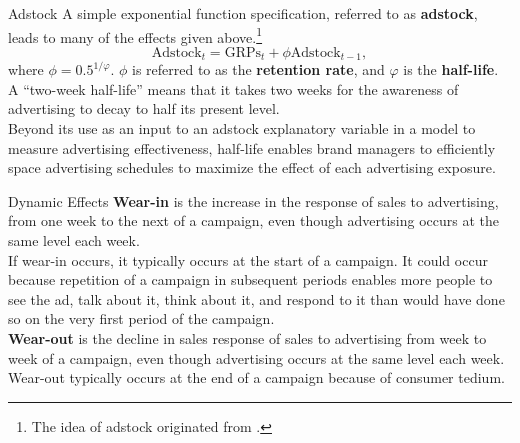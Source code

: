 \documentclass[pdf]{beamer}
\newcommand{\empr}[1]{{\color{franklinblue}\textbf{#1}}}
\theoremstyle{remark}
\theoremstyle{definition}
\begin{document}
\begin{frame}[t]{Adstock}
A simple exponential function specification, referred to as \empr{adstock}, leads to many of the effects given above.\footnote{The idea of adstock originated from \cite{broadbent1979}.} \\
\vspace{-0.5ex}
\begin{equation}
 \text{Adstock}_t = \text{GRPs}_t + \phi \text{Adstock}_{t-1},
\end{equation}
where $\phi = 0.5^{1/\varphi}$.  $\phi$ is referred to as the \empr{retention rate}, and $\varphi$ is the \empr{half-life}. \\
\vspace{1.5ex}
A ``two-week half-life'' means that it takes two weeks for the awareness of advertising to decay to half its present level. \\
\vspace{1.5ex}
Beyond its use as an input to an adstock explanatory variable in a model to measure advertising effectiveness,   half-life enables brand managers to  efficiently space advertising schedules to maximize the effect of each advertising exposure.
\end{frame}

\begin{frame}[t]{Dynamic Effects}
\empr{Wear-in} is the increase in the response of sales to advertising, from one week to the next of a campaign, even though advertising occurs at the same level each week.  \\
\vspace{1.5ex}
If wear-in occurs, it typically occurs at the start of a campaign. It could occur because repetition of a campaign in subsequent periods enables more people to see the ad, talk about it,  think about it, and respond to it than would have
done so on the very first period of the campaign. \\
\vspace{1.5ex}
\empr{Wear-out} is the decline in sales response of sales to advertising from week to week of a campaign, even though advertising occurs at the same level each week. \\
\vspace{1.5ex}
Wear-out typically occurs at the end of a campaign because of consumer tedium.
\end{frame}
\end{document}
